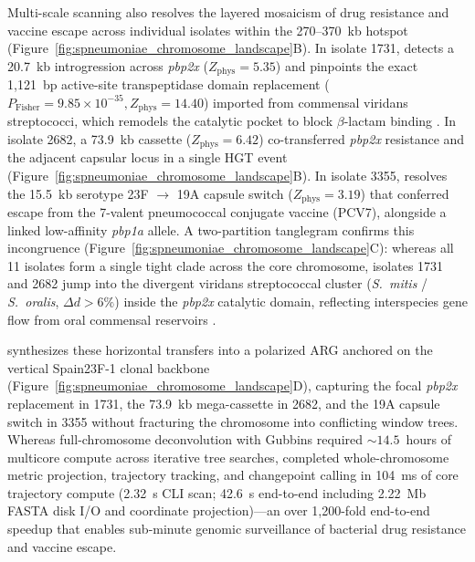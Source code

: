 Multi-scale scanning also resolves the layered mosaicism of drug resistance and vaccine escape across individual isolates within the 270--370~kb hotspot (Figure~\ref{fig:spneumoniae_chromosome_landscape}B). In isolate 1731, \RhizAeon detects a 20.7~kb introgression across \textit{pbp2x} ($Z_{\mathrm{phys}} = 5.35$) and pinpoints the exact 1,121~bp active-site transpeptidase domain replacement ($P_{\mathrm{Fisher}} = 9.85 \times 10^{-35}, Z_{\mathrm{phys}} = 14.40$) imported from commensal viridans streptococci, which remodels the catalytic pocket to block $\beta$-lactam binding \citep{dessen2001crystal}. In isolate 2682, a 73.9~kb cassette ($Z_{\mathrm{phys}} = 6.42$) co-transferred \textit{pbp2x} resistance and the adjacent capsular locus in a single HGT event (Figure~\ref{fig:spneumoniae_chromosome_landscape}B). In isolate 3355, \RhizAeon resolves the 15.5~kb serotype 23F $\to$ 19A capsule switch ($Z_{\mathrm{phys}} = 3.19$) that conferred escape from the 7-valent pneumococcal conjugate vaccine (PCV7), alongside a linked low-affinity \textit{pbp1a} allele. A two-partition tanglegram confirms this incongruence (Figure~\ref{fig:spneumoniae_chromosome_landscape}C): whereas all 11 isolates form a single tight clade across the core chromosome, isolates 1731 and 2682 jump into the divergent viridans streptococcal cluster (\textit{S.~mitis} / \textit{S.~oralis}, $\Delta d > 6\%$) inside the \textit{pbp2x} catalytic domain, reflecting interspecies gene flow from oral commensal reservoirs \citep{hanage2009hyper}.

\RhizAeon synthesizes these horizontal transfers into a polarized ARG anchored on the vertical Spain23F-1 clonal backbone (Figure~\ref{fig:spneumoniae_chromosome_landscape}D), capturing the focal \textit{pbp2x} replacement in 1731, the 73.9~kb mega-cassette in 2682, and the 19A capsule switch in 3355 without fracturing the chromosome into conflicting window trees. Whereas full-chromosome deconvolution with Gubbins required $\sim 14.5$~hours of multicore compute across iterative tree searches, \RhizAeon completed whole-chromosome metric projection, trajectory tracking, and changepoint calling in 104~ms of core trajectory compute (2.32~s CLI scan; 42.6~s end-to-end including 2.22~Mb FASTA disk I/O and coordinate projection)—an over 1,200-fold end-to-end speedup that enables sub-minute genomic surveillance of bacterial drug resistance and vaccine escape.

